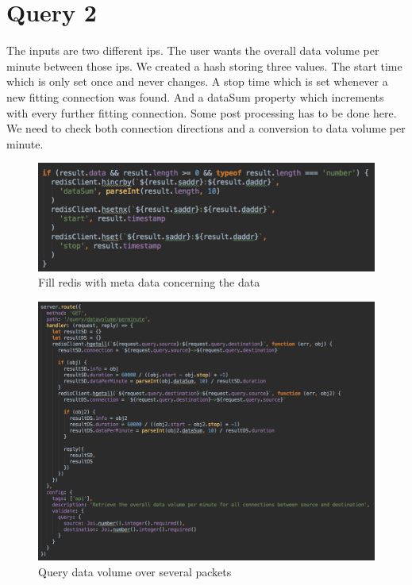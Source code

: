 \section{Query 2}
The inputs are two different ips. The user wants the overall data volume per minute between those ips. We created a hash storing three values. The start time which is only set once and never changes. A stop time which is set whenever a new fitting connection was found. And a dataSum property which increments with every further fitting connection. Some post processing has to be done here. We need to check both connection directions and a conversion to data volume per minute.

  \begin{figure}[htb!]
	\centerline{\includegraphics[width=1.0\textwidth]{resources/solution2-4.png}}
	\caption{Fill redis with meta data concerning the data}
	\label{query2}
\end{figure}

\begin{figure}[htb!]
	\centerline{\includegraphics[width=1.0\textwidth]{resources/solution2-5.png}}
	\caption{Query data volume over several packets}
	\label{query22}
\end{figure}

